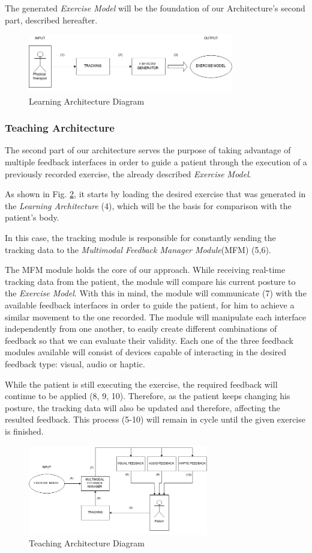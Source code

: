 The generated \emph{Exercise Model} will be the foundation of our Architecture's second part, described hereafter.


\begin{figure}
	\centering
	\includegraphics[width=0.8\textwidth]{imgs/LearningPhase}
	\caption{Learning Architecture Diagram}
	\label{fig:learning}
\end{figure}

\subsubsection{Teaching Architecture}

The second part of our architecture serves the purpose of taking advantage of 
multiple feedback interfaces in order to guide a patient through 
the execution of a previously recorded exercise, the already described \emph{Exercise Model}.

As shown in Fig. \ref{fig:teaching}, it starts by 
loading the desired exercise that was generated in the \emph{Learning Architecture} (4), which will be the basis for comparison with the patient's body.

In this case, the tracking module is responsible for constantly sending the tracking data to the \emph{Multimodal Feedback Manager Module}(MFM) (5,6).

The \ac{MFM} module holds the core of our approach. While receiving real-time tracking data from the patient, the module will compare his current posture to the \emph{Exercise Model}.
With this in mind, the module will communicate (7) with the available feedback interfaces in order to guide the patient, for him to achieve a similar movement to the one recorded.
The module will manipulate each interface independently from one another, to easily create different combinations of feedback so that we can evaluate their validity.
Each one of the three feedback modules available will consist of devices capable of interacting in the desired feedback type: visual, audio or haptic. 

While the patient is still executing the exercise, the required feedback will continue to be applied (8, 9, 10). Therefore, as the patient keeps changing his posture, the tracking data will also be updated and therefore, affecting the resulted feedback.
This process (5-10) will remain in cycle until the given exercise is finished.


\begin{figure}
	\centering
	\includegraphics[width=0.7\textwidth]{imgs/TeachingPhase}
	\caption{Teaching Architecture Diagram}
	\label{fig:teaching}
\end{figure}
